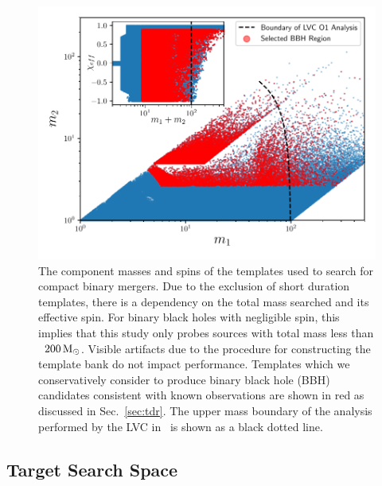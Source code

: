 \begin{figure}[h]
  \centering
    \includegraphics[width=\columnwidth]{figs/chapter5/bank.pdf}
\caption{The component masses and spins of the templates used to search for compact binary mergers. Due to the exclusion of short duration templates, there is a dependency on the total mass searched and its effective spin. For binary black holes with negligible spin, this implies that this study only probes sources with total mass less than ~$200\,\mathrm{M}_{\odot}$. Visible artifacts due to the procedure for constructing the template bank do not impact performance. Templates which we conservatively consider to produce binary black hole (BBH) candidates consistent with known observations are shown in red as discussed in Sec.~\ref{sec:tdr}. The upper mass boundary of the analysis performed by the LVC in~\cite{TheLIGOScientific:2016pea} is shown
as a black dotted line.}
\label{fig:bank}
\end{figure}

\subsection{Target Search Space}

